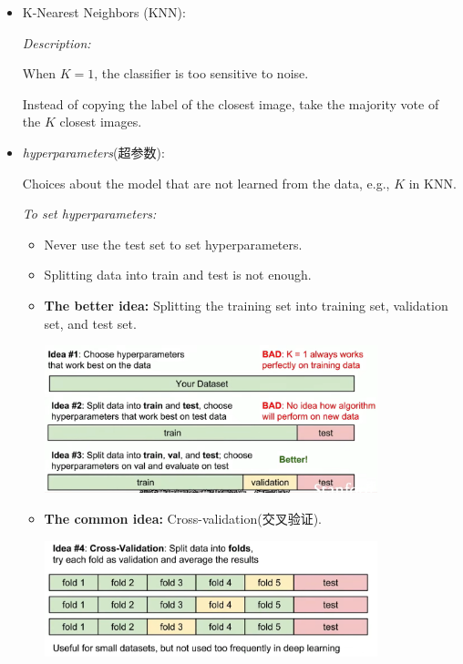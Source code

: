 \documentclass{article}
\begin{document}
\begin{CJK}{UTF8}{gbsn}
\begin{enumerate}
\begin{enumerate}
\begin{itemize}
            \item K-Nearest Neighbors (KNN):\par
            \textit{Description:} \par
            When \(K = 1\), the classifier is too sensitive to noise.\par
            Instead of copying the label of the closest image, take the majority vote of the \(K\) closest images.
            \item \textit{hyperparameters}(超参数):\par
            Choices about the model that are not learned from the data, e.g., \(K\) in KNN.\par
            \textit{To set hyperparameters:}\par
            \begin{itemize}
                \item Never use the test set to set hyperparameters.\par
                \item Splitting data into train and test is not enough.\par
                \item \textbf{The better idea:} Splitting the training set into training set, validation set, and test set.\par
                \includegraphics[width=0.8\textwidth]{images/Lecture1/ideas_for_hyperparameter.png}
                \item \textbf{The common idea:} Cross-validation(交叉验证).\par
                \includegraphics[width=0.8\textwidth]{images/Lecture1/cross_validation.png}
            \end{itemize}


\end{itemize}
\end{enumerate}
\end{enumerate}
\end{CJK}
\end{document}
